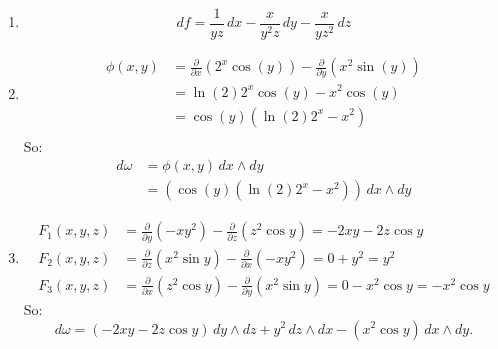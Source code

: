 \documentclass[11pt]{article}
\begin{document}
\begin{solution}
	\begin{enumerate}
		\item
		      $$
			      df = \frac{1}{yz} \, dx - \frac{x}{y^2z} \, dy - \frac{x}{yz^2} \, dz
		      $$
		\item
		      $$
			      \begin{aligned}
				      \phi(x, y) & = \frac{\partial}{\partial x}(2^x \cos(y)) - \frac{\partial}{\partial y}(x^2 \sin(y)) \\
				                 & = \ln(2) 2^x \cos(y) - x^2 \cos(y)                                                    \\
				                 & = \cos(y) \left( \ln(2) 2^x - x^2 \right)                                             \\
			      \end{aligned}
		      $$
		      So:
		      $$
			      \begin{aligned}
				      d\omega & = \phi(x,y) \, dx \wedge dy                                              \\
				              & = \left( \cos(y) \left( \ln(2) 2^x - x^2 \right) \right) \, dx \wedge dy
			      \end{aligned}
		      $$
		\item
		      $$
			      \begin{aligned}
				      F_1(x,y,z) & = \frac{\partial}{\partial y}(-xy^2) - \frac{\partial}{\partial z}(z^2 \cos y) = -2xy - 2z \cos y                  \\
				      F_2(x,y,z) & = \frac{\partial}{\partial z}(x^2 \sin y) - \frac{\partial}{\partial x}(-xy^2) = 0 + y^2 = y^2                     \\
				      F_3(x,y,z) & = \frac{\partial}{\partial x}(z^2 \cos y) - \frac{\partial}{\partial y}(x^2 \sin y) = 0 - x^2 \cos y = -x^2 \cos y
			      \end{aligned}
		      $$
		      So:
		      $$
			      d\omega = (-2xy - 2z \cos y) \, dy \wedge dz + y^2 \, dz \wedge dx - (x^2 \cos y) \, dx \wedge dy.
		      $$
	\end{enumerate}
\end{solution}
\end{document}
